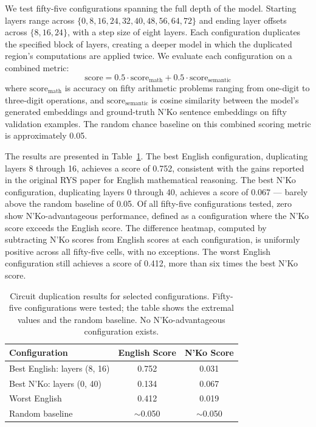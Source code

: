 \documentclass[11pt]{article}
\newcommand{\nko}{N'Ko}
\begin{document}
We test fifty-five configurations spanning the full depth of the model. Starting layers range across $\{0, 8, 16, 24, 32, 40, 48, 56, 64, 72\}$ and ending layer offsets across $\{8, 16, 24\}$, with a step size of eight layers. Each configuration duplicates the specified block of layers, creating a deeper model in which the duplicated region's computations are applied twice. We evaluate each configuration on a combined metric:
\begin{equation}
\text{score} = 0.5 \cdot \text{score}_{\text{math}} + 0.5 \cdot \text{score}_{\text{semantic}}
\label{eq:rys_score}
\end{equation}
where $\text{score}_{\text{math}}$ is accuracy on fifty arithmetic problems ranging from one-digit to three-digit operations, and $\text{score}_{\text{semantic}}$ is cosine similarity between the model's generated embeddings and ground-truth \nko{} sentence embeddings on fifty validation examples. The random chance baseline on this combined scoring metric is approximately 0.05.

The results are presented in Table~\ref{tab:circuit_dup}. The best English configuration, duplicating layers 8 through 16, achieves a score of 0.752, consistent with the gains reported in the original RYS paper for English mathematical reasoning. The best \nko{} configuration, duplicating layers 0 through 40, achieves a score of 0.067 --- barely above the random baseline of 0.05. Of all fifty-five configurations tested, zero show \nko{}-advantageous performance, defined as a configuration where the \nko{} score exceeds the English score. The difference heatmap, computed by subtracting \nko{} scores from English scores at each configuration, is uniformly positive across all fifty-five cells, with no exceptions. The worst English configuration still achieves a score of 0.412, more than six times the best \nko{} score.

\begin{table}[t]
\centering
\small
\caption{Circuit duplication results for selected configurations. Fifty-five configurations were tested; the table shows the extremal values and the random baseline. No \nko{}-advantageous configuration exists.}
\label{tab:circuit_dup}
\begin{tabular}{@{}lcc@{}}
\toprule
Configuration & English Score & \nko{} Score \\
\midrule
Best English: layers (8, 16) & 0.752 & 0.031 \\
Best \nko{}: layers (0, 40) & 0.134 & 0.067 \\
Worst English & 0.412 & 0.019 \\
Random baseline & $\sim$0.050 & $\sim$0.050 \\
\bottomrule
\end{tabular}
\end{table}
\end{document}
